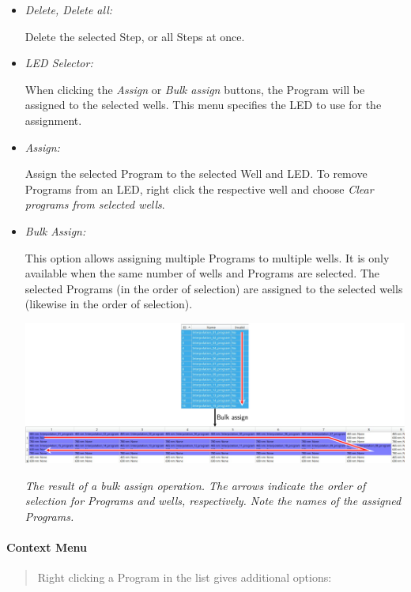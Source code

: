 \begin{itemize}
\item
  \emph{Delete, Delete all:}

  Delete the selected Step, or all Steps at once.
\item
  \emph{LED Selector:}

  When clicking the \emph{Assign} or \emph{Bulk assign} buttons, the
  Program will be assigned to the selected wells. This menu specifies
  the LED to use for the assignment.
\item
  \emph{Assign:}

  Assign the selected Program to the selected Well and LED. To remove
  Programs from an LED, right click the respective well and choose
  \emph{Clear programs from selected wells}.
\item
  \emph{Bulk Assign:}

  This option allows assigning multiple Programs to multiple wells. It
  is only available when the same number of wells and Programs are
  selected. The selected Programs (in the order of selection) are
  assigned to the selected wells (likewise in the order of selection).

  \includegraphics{images/annotated/bulk_assign.jpg}

  \emph{The result of a bulk assign operation. The arrows indicate the
  order of selection for Programs and wells, respectively. Note the
  names of the assigned Programs.}
\end{itemize}

\hypertarget{context-menu-1}{%
\paragraph{Context Menu}\label{context-menu-1}}

\begin{quote}
Right clicking a Program in the list gives additional options:
\end{quote}

